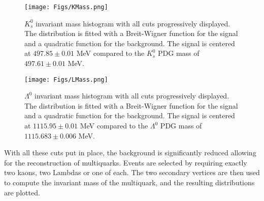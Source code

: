 \documentclass{article}
\begin{document}
\begin{figure}[!h]
\centering
\begin{minipage}{.48\textwidth}
\centering
\texttt{[image: Figs/KMass.png]}
\caption{\small $K_s^0$ invariant mass histogram with all cuts progressively
displayed. The distribution is fitted with a Breit-Wigner function for the
signal and a quadratic function for the background. The signal is centered at
$497.85 \pm 0.01$ \unit{MeV} compared to the $K_s^0$ PDG mass of $497.61 \pm
0.01$ \unit{MeV}\cite{KBranchingRatio}.}
\label{figure: KMass}
\end{minipage}%
\hfill
\begin{minipage}{.48\textwidth}
\centering
\texttt{[image: Figs/LMass.png]}
\caption{\small $\Lambda^0$ invariant mass histogram with all cuts progressively
displayed. The distribution is fitted with a Breit-Wigner function for the
signal and a quadratic function for the background. The signal is centered at
$1115.95 \pm 0.01$ \unit{MeV} compared to the $\Lambda^0$ PDG mass of $1115.683 \pm
0.006$ \unit{MeV}\cite{LBranchingRatio}.}
\label{figure: KMass}
\end{minipage}
\end{figure}


With all these cuts put in place, the background is significantly reduced 
allowing for the reconstruction of multiquarks. Events are selected by requiring 
exactly two kaons, two Lambdas or one of each. The two secondary 
vertices are then used to compute the invariant mass of the multiquark, and the resulting 
distributions are plotted. 
\end{document}
